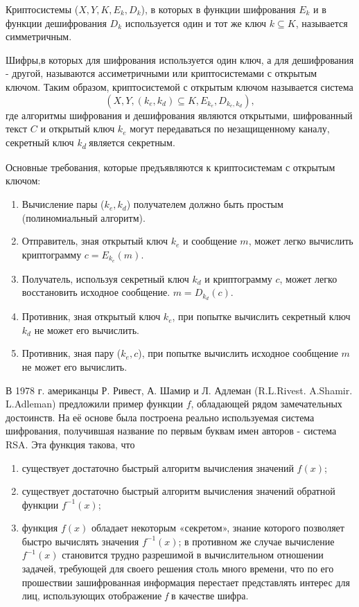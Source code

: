   Криптосистемы ($X, Y, K, E_{k}, D_{k}$), в которых в функции шифрования $E_{k}$ и в функции 
дешифрования $D_{k}$ используется один и тот же ключ $k \subseteq K$, называется симметричным. 

  Шифры,в которых для шифрования используется один ключ, а для дешифрования - другой, называются ассиметричными или криптосистемами с открытым ключом. Таким образом, криптосистемой с открытым ключом называется система 
  \begin{equation}
    (X, Y, (k_{e}, k_{d}) \subseteq K, E_{k_{e}}, D_{k_{e},k_{d}}), 
  \end{equation}
  где алгоритмы шифрования и дешифрования являются открытыми, шифрованный текст $C$ и открытый ключ $k_{e}$ могут 
передаваться по незащищенному каналу, секретный ключ \textit{k\textsubscript{d}} является секретным.

Основные требования, которые предъявляются к криптосистемам с открытым ключом:
\begin{enumerate}
	\item Вычисление пары ($k_{e}, k_{d}$) получателем должно быть простым (полиномиальный алгоритм).
	\item Отправитель, зная открытый ключ $k_{e}$ и сообщение $m$, может легко вычислить криптограмму 
$c = E_{k_{e}}(m)$.
	\item Получатель, используя секретный ключ $k_{d}$ и криптограмму $c$, может легко восстановить исходное сообщение.
$m = D_{k_{d}}(c)$.
	\item Противник, зная открытый ключ $k_{e}$, при попытке вычислить секретный ключ $k_{d}$ не может его 
вычислить.
	\item Противник, зная пару ($k_{e}, c$), при попытке вычислить исходное сообщение $m$ не может его вычислить.
\end{enumerate}

  В 1978 г. американцы Р. Ривест, А. Шамир и Л. Адлеман (R.L.Rivest. A.Shamir. L.Adleman) предложили пример функции $f$, обладающей рядом 
замечательных достоинств. На её основе была построена реально используемая система шифрования, получившая название по первым буквам имен авторов - 
система RSA. Эта функция такова, что
\begin{enumerate}
    \item существует достаточно быстрый алгоритм вычисления значений $f(x)$;
    \item существует достаточно быстрый алгоритм вычисления значений обратной функции $f^{ -1}(x)$;
    \item функция $f(x)$ обладает некоторым «секретом», знание которого позволяет быстро вычислять значения $f^{ -1}(x)$;
в противном же случае вычисление $f^{ -1}(x)$ становится трудно разрешимой в вычислительном отношении задачей, требующей для 
своего решения столь много времени, что по его прошествии зашифрованная информация перестает представлять интерес для лиц, 
использующих отображение \textit{f} в качестве шифра.
\end{enumerate}	

